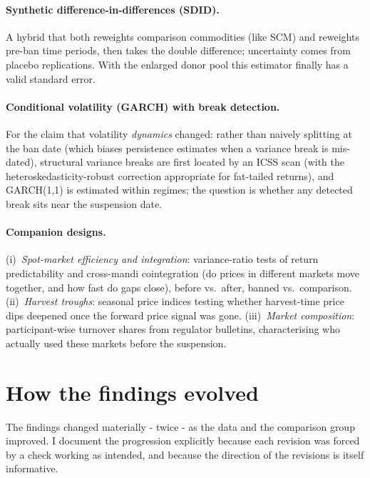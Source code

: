 \documentclass[11pt]{article}
\begin{document}
\paragraph{Synthetic difference-in-differences (SDID).} A hybrid that both reweights
comparison commodities (like SCM) and reweights pre-ban time periods, then takes the
double difference; uncertainty comes from placebo replications. With the enlarged donor
pool this estimator finally has a valid standard error.

\paragraph{Conditional volatility (GARCH) with break detection.} For the claim that
volatility \emph{dynamics} changed: rather than naively splitting at the ban date (which
biases persistence estimates when a variance break is mis-dated), structural variance
breaks are first located by an ICSS scan (with the heteroskedasticity-robust correction
appropriate for fat-tailed returns), and GARCH(1,1) is estimated within regimes; the
question is whether any detected break sits near the suspension date.

\paragraph{Companion designs.} (i)~\emph{Spot-market efficiency and integration}:
variance-ratio tests of return predictability and cross-mandi cointegration (do prices in
different markets move together, and how fast do gaps close), before vs.\ after, banned
vs.\ comparison. (ii)~\emph{Harvest troughs}: seasonal price indices testing whether
harvest-time price dips deepened once the forward price signal was gone.
(iii)~\emph{Market composition}: participant-wise turnover shares from regulator
bulletins, characterising who actually used these markets before the suspension.

\section{How the findings evolved}
\label{sec:progression}

The findings changed materially - twice - as the data and the comparison group
improved. I document the progression explicitly because each revision was forced by a
check working as intended, and because the direction of the revisions is itself
informative.
\end{document}
